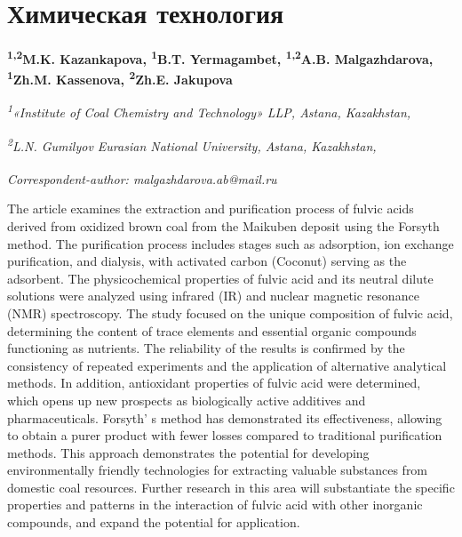 \let\cleardoublepage\clearpage
\chapter{Химическая технология}

\begin{articleheader}

{\bfseries
\textsuperscript{1,2}M.K. Kazankapova,
\textsuperscript{1}B.T. Yermagambet,
\textsuperscript{1,2}A.B. Malgazhdarova\textsuperscript{\envelope },
\textsuperscript{1}Zh.M. Kassenova,
\textsuperscript{2}Zh.E. Jakupova}
\end{articleheader}

\begin{affiliation}
\emph{\textsuperscript{1}«Institute of Coal Chemistry and Technology» LLP, Astana, Kazakhstan,}

\emph{\textsuperscript{2}L.N. Gumilyov Eurasian National University, Astana, Kazakhstan,}

\raggedright {\bfseries \textsuperscript{\envelope }}{\em Correspondent-author: malgazhdarova.ab@mail.ru}
\end{affiliation}

The article examines the extraction and purification process of fulvic
acids derived from oxidized brown coal from the Maikuben deposit using
the Forsyth method. The purification process includes stages such as
adsorption, ion exchange purification, and dialysis, with activated
carbon (Coconut) serving as the adsorbent. The physicochemical
properties of fulvic acid and its neutral dilute solutions were analyzed
using infrared (IR) and nuclear magnetic resonance (NMR) spectroscopy.
The study focused on the unique composition of fulvic acid, determining
the content of trace elements and essential organic compounds
functioning as nutrients. The reliability of the results is confirmed by
the consistency of repeated experiments and the application of
alternative analytical methods. In addition, antioxidant properties of
fulvic acid were determined, which opens up new prospects as
biologically active additives and pharmaceuticals.
Forsyth' s method has demonstrated its effectiveness,
allowing to obtain a purer product with fewer losses compared to
traditional purification methods. This approach demonstrates the
potential for developing environmentally friendly technologies for
extracting valuable substances from domestic coal resources. Further
research in this area will substantiate the specific properties and
patterns in the interaction of fulvic acid with other inorganic
compounds, and expand the potential for application.

